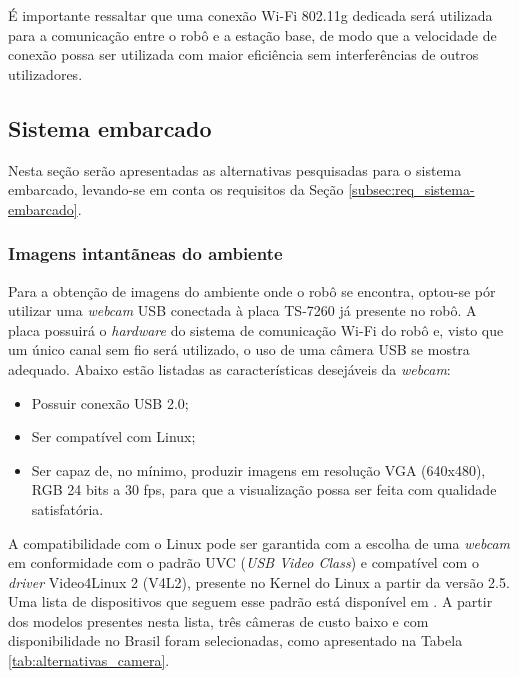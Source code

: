 É importante ressaltar que uma conexão Wi-Fi 802.11g dedicada será utilizada para a comunicação entre o robô e a estação base, de modo que a velocidade de conexão possa ser utilizada com maior eficiência sem interferências de outros utilizadores.


\subsection{Sistema embarcado}
\label{subsec:opcoes_sist-embarcado}
Nesta seção serão apresentadas as alternativas pesquisadas para o sistema embarcado, levando-se em conta os requisitos da Seção \ref{subsec:req_sistema-embarcado}.

\subsubsection{Imagens intantãneas do ambiente}

Para a obtenção de imagens do ambiente onde o robô se encontra, optou-se pór utilizar uma \textit{webcam} USB conectada à placa TS-7260 já presente no robô. A placa possuirá o \textit{hardware} do sistema de comunicação Wi-Fi do robô e, visto que um único canal sem fio será utilizado, o uso de uma câmera USB se mostra adequado. Abaixo estão listadas as características desejáveis da \textit{webcam}:

\begin{itemize}
  \item Possuir conexão USB 2.0;
  \item Ser compatível com Linux;
  \item Ser capaz de, no mínimo, produzir imagens em resolução VGA (640x480), RGB 24 bits a 30 fps, para que a visualização possa ser feita com qualidade satisfatória.
\end{itemize}

A compatibilidade com o Linux pode ser garantida com a escolha de uma \textit{webcam} em conformidade com o padrão UVC (\textit{USB Video Class}) e compatível com o \textit{driver} Video4Linux 2 (V4L2), presente no Kernel do Linux a partir da versão 2.5. Uma lista de dispositivos que seguem esse padrão está disponível em \cite{uvc-linux}. A partir dos modelos presentes nesta lista, três câmeras de custo baixo e com disponibilidade no Brasil foram selecionadas, como apresentado na Tabela \ref{tab:alternativas_camera}.


